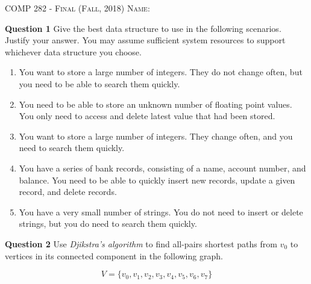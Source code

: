 \documentclass{letter}
\newcommand{\heading}[1]{{\large \textsc{#1}}}
\begin{document}
\heading{COMP 282 - Final (Fall, 2018)}
\kern 2cm
\heading{Name:}

{\bf Question 1} \kern 1cm Give the best data structure to use in the following
scenarios.  Justify your answer.  You may assume sufficient system resources to
support whichever data structure you choose. 


\begin{enumerate}[label=(\alph*)]

\item You want to store a large number of integers.  They do not change often,
but you need to be able to search them quickly.

\vspace{3cm}

\item You need to be able to store an unknown number of floating point values.
You only need to access and delete latest value that had been stored.

\vspace{3cm}

\item You want to store a large number of integers.  They change often, and you
need to search them quickly.

\vspace{3cm}

\item You have a series of bank records, consisting of a name, account number,
and balance.  You need to be able to quickly insert new records, update a given
record, and delete records.

\vspace{3cm}

\item You have a very small number of strings.  You do not need to insert or
delete strings, but you do need to search them quickly.

\end{enumerate}

\clearpage

{\bf Question 2} \kern 1cm Use {\em Djikstra's algorithm} to find all-pairs
shortest paths from $v_0$ to vertices in its connected component in the
following graph.

\begin{equation*}
V = \{ v_0, v_1, v_2, v_3, v_4, v_5, v_6, v_7 \}
\end{equation*}
\end{document}
